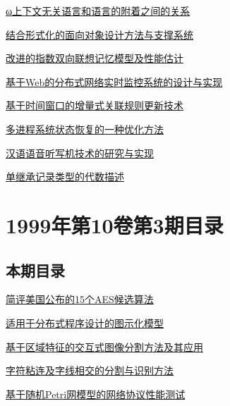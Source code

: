 \documentclass[a4paper]{article}
\begin{document}
\href{http://www.jos.org.cn/ch/reader/download_pdf.aspx?file_no=19990413&year_id=1999&quarter_id=4&falg=1}{ω上下文无关语言和语言的附着之间的关系}

\href{http://www.jos.org.cn/ch/reader/download_pdf.aspx?file_no=19990414&year_id=1999&quarter_id=4&falg=1}{结合形式化的面向对象设计方法与支撑系统}

\href{http://www.jos.org.cn/ch/reader/download_pdf.aspx?file_no=19990415&year_id=1999&quarter_id=4&falg=1}{改进的指数双向联想记忆模型及性能估计}

\href{http://www.jos.org.cn/ch/reader/download_pdf.aspx?file_no=19990416&year_id=1999&quarter_id=4&falg=1}{基于Web的分布式网络实时监控系统的设计与实现}

\href{http://www.jos.org.cn/ch/reader/download_pdf.aspx?file_no=19990417&year_id=1999&quarter_id=4&falg=1}{基于时间窗口的增量式关联规则更新技术}

\href{http://www.jos.org.cn/ch/reader/download_pdf.aspx?file_no=19990418&year_id=1999&quarter_id=4&falg=1}{多进程系统状态恢复的一种优化方法}

\href{http://www.jos.org.cn/ch/reader/download_pdf.aspx?file_no=19990419&year_id=1999&quarter_id=4&falg=1}{汉语语音听写机技术的研究与实现}

\href{http://www.jos.org.cn/ch/reader/download_pdf.aspx?file_no=19990420&year_id=1999&quarter_id=4&falg=1}{单继承记录类型的代数描述}


\section{\textbf{1999年第10卷第3期目录}}
\subsection{本期目录}
\href{http://www.jos.org.cn/ch/reader/download_pdf.aspx?file_no=19990301&year_id=1999&quarter_id=3&falg=1}{简评美国公布的15个AES候选算法}

\href{http://www.jos.org.cn/ch/reader/download_pdf.aspx?file_no=19990302&year_id=1999&quarter_id=3&falg=1}{适用于分布式程序设计的图示化模型}

\href{http://www.jos.org.cn/ch/reader/download_pdf.aspx?file_no=19990303&year_id=1999&quarter_id=3&falg=1}{基于区域特征的交互式图像分割方法及其应用}

\href{http://www.jos.org.cn/ch/reader/download_pdf.aspx?file_no=19990304&year_id=1999&quarter_id=3&falg=1}{字符粘连及字线相交的分割与识别方法}

\href{http://www.jos.org.cn/ch/reader/download_pdf.aspx?file_no=19990305&year_id=1999&quarter_id=3&falg=1}{基于随机Petri网模型的网络协议性能测试}
\end{document}
